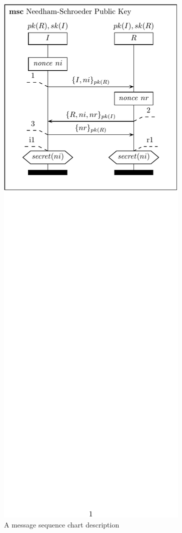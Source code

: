 \documentclass{book}
\begin{document}
\begin{figure}[!htb]
	\centering
  \includegraphics{msc-ns}
  \caption{A message sequence chart description}
  \label{msc:ns3}
\end{figure}
\end{document}
